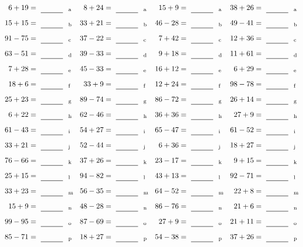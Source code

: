 \documentclass
[
  draft    = true,
  fontsize = 11pt,
  parskip  = half-
]
{scrartcl}
\begin{document}
\clearpage
\begin{align*}
    \pline{6+19}&=\rline{a}
  & \pline{8+24}&=\rline{a}
  & \pline{15+9}&=\rline{a}
  & \pline{38+26}&=\rline{a} \\[1ex]
    \pline{15+15}&=\rline{b}
  & \pline{33+21}&=\rline{b}
  & \pline{46-28}&=\rline{b}
  & \pline{49-41}&=\rline{b} \\[1ex]
    \pline{91-75}&=\rline{c}
  & \pline{37-22}&=\rline{c}
  & \pline{7+42}&=\rline{c}
  & \pline{12+36}&=\rline{c} \\[1ex]
    \pline{63-51}&=\rline{d}
  & \pline{39-33}&=\rline{d}
  & \pline{9+18}&=\rline{d}
  & \pline{11+61}&=\rline{d} \\[1ex]
    \pline{7+28}&=\rline{e}
  & \pline{45-33}&=\rline{e}
  & \pline{16+12}&=\rline{e}
  & \pline{6+29}&=\rline{e} \\[1ex]
    \pline{18+6}&=\rline{f}
  & \pline{33+9}&=\rline{f}
  & \pline{12+24}&=\rline{f}
  & \pline{98-78}&=\rline{f} \\[1ex]
    \pline{25+23}&=\rline{g}
  & \pline{89-74}&=\rline{g}
  & \pline{86-72}&=\rline{g}
  & \pline{26+14}&=\rline{g} \\[1ex]
    \pline{6+22}&=\rline{h}
  & \pline{62-46}&=\rline{h}
  & \pline{36+36}&=\rline{h}
  & \pline{27+9}&=\rline{h} \\[1ex]
    \pline{61-43}&=\rline{i}
  & \pline{54+27}&=\rline{i}
  & \pline{65-47}&=\rline{i}
  & \pline{61-52}&=\rline{i} \\[1ex]
    \pline{33+21}&=\rline{j}
  & \pline{52-44}&=\rline{j}
  & \pline{6+36}&=\rline{j}
  & \pline{18+27}&=\rline{j} \\[1ex]
    \pline{76-66}&=\rline{k}
  & \pline{37+26}&=\rline{k}
  & \pline{23-17}&=\rline{k}
  & \pline{9+15}&=\rline{k} \\[1ex]
    \pline{25+15}&=\rline{l}
  & \pline{94-82}&=\rline{l}
  & \pline{43+13}&=\rline{l}
  & \pline{92-71}&=\rline{l} \\[1ex]
    \pline{33+23}&=\rline{m}
  & \pline{56-35}&=\rline{m}
  & \pline{64-52}&=\rline{m}
  & \pline{22+8}&=\rline{m} \\[1ex]
    \pline{15+9}&=\rline{n}
  & \pline{48-28}&=\rline{n}
  & \pline{86-76}&=\rline{n}
  & \pline{21+6}&=\rline{n} \\[1ex]
    \pline{99-95}&=\rline{o}
  & \pline{87-69}&=\rline{o}
  & \pline{27+9}&=\rline{o}
  & \pline{21+11}&=\rline{o} \\[1ex]
    \pline{85-71}&=\rline{p}
  & \pline{18+27}&=\rline{p}
  & \pline{54-38}&=\rline{p}
  & \pline{37+26}&=\rline{p}
\end{align*}
\end{document}
